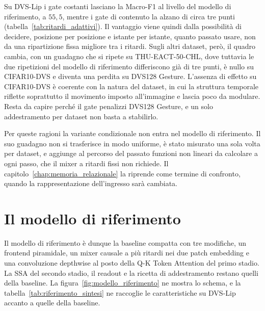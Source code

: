 Su DVS-Lip i gate costanti lasciano la Macro-F1 al livello del modello di riferimento, a $55{,}5$, mentre i gate di contenuto la alzano di circa tre punti (tabella~\ref{tab:ritardi_adattivi}). Il vantaggio viene quindi dalla possibilità di decidere, posizione per posizione e istante per istante, quanto passato usare, non da una ripartizione fissa migliore tra i ritardi. Sugli altri dataset, però, il quadro cambia, con un guadagno che si ripete su THU-EACT-50-CHL, dove tuttavia le due ripetizioni del modello di riferimento differiscono già di tre punti, è nullo su CIFAR10-DVS e diventa una perdita su DVS128 Gesture. L'assenza di effetto su CIFAR10-DVS è coerente con la natura del dataset, in cui la struttura temporale riflette soprattutto il movimento imposto all'immagine e lascia poco da modulare. Resta da capire perché il gate penalizzi DVS128 Gesture, e un solo addestramento per dataset non basta a stabilirlo.

Per queste ragioni la variante condizionale non entra nel modello di riferimento. Il suo guadagno non si trasferisce in modo uniforme, è stato misurato una sola volta per dataset, e aggiunge al percorso del passato funzioni non lineari da calcolare a ogni passo, che il mixer a ritardi fissi non richiede. Il capitolo~\ref{chap:memoria_relazionale} la riprende come termine di confronto, quando la rappresentazione dell'ingresso sarà cambiata.



\section{Il modello di riferimento}
\label{sec:modello_riferimento}

Il modello di riferimento è dunque la baseline compatta con tre modifiche, un frontend piramidale, un mixer causale a più ritardi nei due patch embedding e una convoluzione depthwise al posto della Q-K Token Attention del primo stadio. La SSA del secondo stadio, il readout e la ricetta di addestramento restano quelli della baseline. La figura~\ref{fig:modello_riferimento} ne mostra lo schema, e la tabella~\ref{tab:riferimento_sintesi} ne raccoglie le caratteristiche su DVS-Lip accanto a quelle della baseline.

